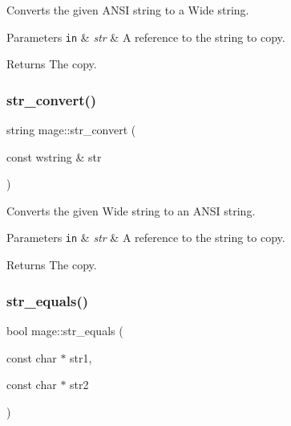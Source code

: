 Converts the given A\+N\+SI string to a Wide string.


\begin{DoxyParams}[1]{Parameters}
\mbox{\tt in}  & {\em str} & A reference to the string to copy. \\
\hline
\end{DoxyParams}
\begin{DoxyReturn}{Returns}
The copy. 
\end{DoxyReturn}
\hypertarget{namespacemage_a3a36d9cbd56787862629cb013437217b}{}\label{namespacemage_a3a36d9cbd56787862629cb013437217b} 
\subsubsection{\texorpdfstring{str\+\_\+convert()}{str\_convert()}\hspace{0.1cm}{\footnotesize\ttfamily [4/4]}}
{\footnotesize\ttfamily string mage\+::str\+\_\+convert (\begin{DoxyParamCaption}\item[{const wstring \&}]{str }\end{DoxyParamCaption})}

Converts the given Wide string to an A\+N\+SI string.


\begin{DoxyParams}[1]{Parameters}
\mbox{\tt in}  & {\em str} & A reference to the string to copy. \\
\hline
\end{DoxyParams}
\begin{DoxyReturn}{Returns}
The copy. 
\end{DoxyReturn}
\hypertarget{namespacemage_a4f78f15f269c1f65d4148983bc8224c5}{}\label{namespacemage_a4f78f15f269c1f65d4148983bc8224c5} 
\subsubsection{\texorpdfstring{str\+\_\+equals()}{str\_equals()}\hspace{0.1cm}{\footnotesize\ttfamily [1/2]}}
{\footnotesize\ttfamily bool mage\+::str\+\_\+equals (\begin{DoxyParamCaption}\item[{const char $\ast$}]{str1,  }\item[{const char $\ast$}]{str2 }\end{DoxyParamCaption})}

